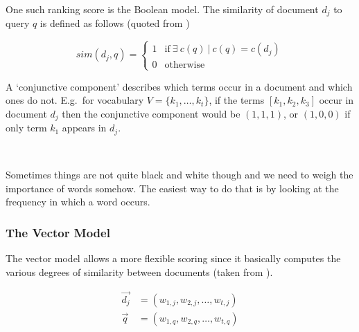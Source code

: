 One such ranking score is the Boolean model. The similarity of document $d_j$ to query $q$ is defined as follows (quoted from \autocite[p.65]{Baeza-Yates2011})

\begin{equation}
  sim(d_j,q) =
  \begin{cases}
  1 & \text{if} \ \exists \ c(q) \ | \ c(q) = c(d_j)\\
  0 & \text{otherwise}
  \end{cases}
  \label{eq:sim}
\end{equation}

A `conjunctive component' describes which terms occur in a document and which ones do not. E.g.\ for vocabulary $V =\{k_{1},\ldots, k_{t}\}$, if the terms $[ k_{1},k_{2},k_{3}]$ occur in document $d_{j}$ then the conjunctive component would be $(1,1,1)$, or $(1,0,0)$ if only term $k_{1}$ appears in $d_{j}$.


\\

Sometimes things are not quite black and white though and we need to weigh the importance of words somehow. The easiest way to do that is by looking at the frequency in which a word occurs.



\subsubsection{The Vector Model}

The vector model allows a more flexible scoring since it basically computes the various degrees of similarity between documents (taken from \autocite[p.78]{Baeza-Yates2011}).

\begin{equation}
  \begin{split}
  \vec{d_j} &= (w_{1,j}, w_{2,j}, \ldots, w_{t,j})\\
  \vec{q} &= (w_{1,q}, w_{2,q}, \ldots, w_{t,q})
  \end{split}
  \label{eq:vector}
\end{equation}

